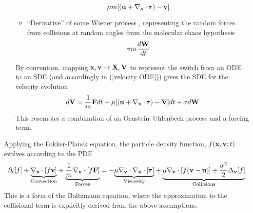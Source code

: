 \begin{itemize}
\begin{itemize}
            \begin{equation}\label{single-phase drag force}
                \mu m[(\mathbf{u} + \nabla_{\mathbf{x}}\cdot\pmb{\mathsf{\tau}}) - \mathbf{v}]
            \end{equation}
            \item  ``Derivative'' of some Wiener process , representing the random forces from collisions at random angles from the molecular chaos hypothesis
            \begin{equation}\label{single-phase brownian motion}
                \sigma m\frac{d\mathbf{W}}{dt}
            \end{equation}
        \end{itemize}
        
        
        By convention, mapping $\mathbf{x}, \mathbf{v}  \mapsto  \mathbf{X}, \mathbf{V}$ to represent the switch from an ODE to an SDE (and accordingly in (\ref{velocity ODE})) gives the SDE for the velocity evolution
        \begin{equation}
            d\mathbf{V}  =  \frac{1}{m}\mathbf{F} dt + \mu[(\mathbf{u} + \nabla_{\mathbf{x}}\cdot\pmb{\mathsf{\tau}}) - \mathbf{V}]dt + \sigma d\mathbf{W}
        \end{equation}
        This resembles a combination of an Ornstein–Uhlenbeck process and a forcing term.
    \end{itemize}
    Applying the Fokker-Planck equation, the particle density function, $f(\mathbf{x}, \mathbf{v}; t)$ evolves according to the PDE
    \begin{equation}\label{single-phase Boltzmann equation}
        \partial_{t}[f] + \underset{\textrm{Convection}}{\underbrace{\nabla_{\mathbf{x}}\cdot[f\mathbf{v}]}} + \underset{\textrm{Forces}}{\underbrace{\frac{1}{m}\nabla_{\mathbf{v}}\cdot[f\mathbf{F}]}}  =  - \underset{\textrm{Viscosity}}{\underbrace{\mu\nabla_{\mathbf{v}}\cdot\nabla_{\mathbf{x}}\cdot[\pmb{\mathsf{\tau}}]}} + \underset{\textrm{Collisions}}{\underbrace{\mu\nabla_{\mathbf{v}}\cdot[f(\mathbf{v} - \mathbf{u})] + \frac{\sigma^{2}}{2}\Delta_{\mathbf{v}}[f]}}
    \end{equation}
    This is a form of the Boltzmann equation, where the approximation to the collisional term is explicitly derived from the above assumptions.